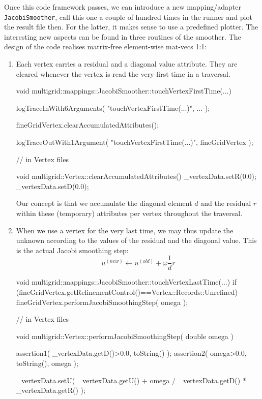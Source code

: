 \noindent
Once this code framework passes, we can introduce a new mapping/adapter
\texttt{JacobiSmoother}, call this one a couple of hundred times in the runner
and plot the result file then. 
For the latter, it makes sense to use a predefined plotter.
The interesting new aspects can be found in three routines of the smoother.
The design of the code realises matrix-free element-wise mat-vecs 1:1: 


\begin{enumerate}
  \item Each vertex carries a residual and a diagonal value attribute. 
    They are cleared whenever the vertex is read the very first time in
    a traversal.
    \begin{code}
void multigrid::mappings::JacobiSmoother::touchVertexFirstTime(...) {
  logTraceInWith6Arguments( "touchVertexFirstTime(...)", ... );

  fineGridVertex.clearAccumulatedAttributes();

  logTraceOutWith1Argument( "touchVertexFirstTime(...)", fineGridVertex );
}

// in Vertex files

void multigrid::Vertex::clearAccumulatedAttributes() {
  _vertexData.setR(0.0);
  _vertexData.setD(0.0);
}
    \end{code}
    
    \noindent
    Our concept is that we accumulate the diagonal element $d$ and the residual
    $r$ within these (temporary) attributes per vertex throughout the traversal.
    
    \item When we use a vertex for the very last time, we may thus update the
    unknown according to the values of the residual and the diagonal value. This
    is the actual Jacobi smoothing step:
    \[
      u ^{(new)} \gets u ^{(old)} + \omega \frac{1}{d} r
    \]
    \begin{code}
void multigrid::mappings::JacobiSmoother::touchVertexLastTime(...) {
  if (fineGridVertex.getRefinementControl()==Vertex::Records::Unrefined) {
    fineGridVertex.performJacobiSmoothingStep( omega );
  }
}

// in Vertex files

void multigrid::Vertex::performJacobiSmoothingStep( double omega ) {
 assertion1( _vertexData.getD()>0.0, toString() );
 assertion2( omega>0.0, toString(), omega );

 _vertexData.setU( _vertexData.getU() + omega / _vertexData.getD() * _vertexData.getR() );
}
    \end{code} 



\end{enumerate}
